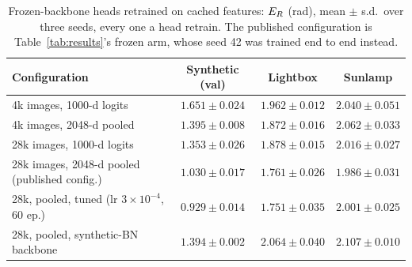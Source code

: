 \begin{table}[ht]
  \caption{Frozen-backbone heads retrained on cached features: $E_{R}$ (rad), mean $\pm$ s.d.\ over three seeds, every one a head retrain. The published configuration is Table~\ref{tab:results}'s frozen arm, whose seed 42 was trained end to end instead.}
  \label{tab:frozen}
  \centering
  \small
  \begin{tabular}{l ccc}
    \toprule
    Configuration & Synthetic (val) & Lightbox & Sunlamp \\
    \midrule
    4k images, 1000-d logits & $1.651{\pm}0.024$ & $1.962{\pm}0.012$ & $2.040{\pm}0.051$ \\
    4k images, 2048-d pooled & $1.395{\pm}0.008$ & $1.872{\pm}0.016$ & $2.062{\pm}0.033$ \\
    28k images, 1000-d logits & $1.353{\pm}0.026$ & $1.878{\pm}0.015$ & $2.016{\pm}0.027$ \\
    28k images, 2048-d pooled (published config.) & $1.030{\pm}0.017$ & $1.761{\pm}0.026$ & $1.986{\pm}0.031$ \\
    28k, pooled, tuned (lr $3{\times}10^{-4}$, 60 ep.) & $0.929{\pm}0.014$ & $1.751{\pm}0.035$ & $2.001{\pm}0.025$ \\
    28k, pooled, synthetic-BN backbone & $1.394{\pm}0.002$ & $2.064{\pm}0.040$ & $2.107{\pm}0.010$ \\
    \bottomrule
  \end{tabular}
\end{table}
